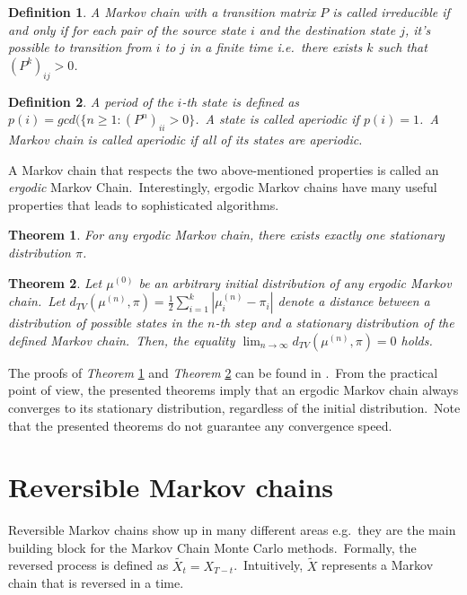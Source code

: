 \documentclass[a4paper, 11pt, onecolumn, openany, titlepage]{report}
\theoremstyle{default_theorem_style}\newtheorem{theorem}{Theorem}
\theoremstyle{default_theorem_style}\newtheorem{definition}{Definition}
\begin{document}
\begin{definition}
A Markov chain with a transition matrix $P$ is called \textit{irreducible} if and only if for each pair of the source
state $i$ and the destination state $j$, it's possible to transition from $i$ to $j$ in a finite time i.e.\ there
exists $k$ such that $(P^k)_{ij} > 0$.
\end{definition}

\begin{definition}
A period of the $i$-th state is defined as $p(i) = gcd(\{n \geq 1 : (P^n)_{ii} > 0\}$.\ A state is called
\textit{aperiodic} if $p(i) = 1$.\ A Markov chain is called aperiodic if all of its states are aperiodic.
\end{definition}

A Markov chain that respects the two above-mentioned properties is called an \textit{ergodic} Markov
Chain.\ Interestingly, ergodic Markov chains have many useful properties that leads to sophisticated algorithms.

\begin{theorem}\label{thm:one_stationary}
For any ergodic Markov chain, there exists exactly one stationary distribution $\pi$.
\end{theorem}

\begin{theorem}\label{thm:converges_to_stationary}
Let $\mu^{(0)}$ be an arbitrary initial distribution of any ergodic Markov chain.\ Let
$d_{TV}(\mu^{(n)}, \pi) = \frac{1}{2} \sum_{i = 1}^{k} |\mu_i^{(n)} - \pi_i|$ denote a distance between a
distribution of possible states in the $n$-th step and a stationary distribution of the defined Markov chain.\ Then,
the equality $\lim_{n \to \infty} d_{TV}(\mu^{(n)}, \pi) = 0$ holds.
\end{theorem}

The proofs of \textit{Theorem} \ref{thm:one_stationary} and \textit{Theorem} \ref{thm:converges_to_stationary} can
be found in \cite{markov_chains_book}.\ From the practical point of view, the presented theorems imply that an
ergodic Markov chain always converges to its stationary distribution, regardless of the initial
distribution.\ Note that the presented theorems do not guarantee any convergence speed.

\section{Reversible Markov chains}

Reversible Markov chains show up in many different areas e.g.\ they are the main building block for the Markov
Chain Monte Carlo methods.\ Formally, the reversed process is defined as $\tilde{X_t} = X_{T - t}$.\ Intuitively,
$\tilde{X}$ represents a Markov chain that is reversed in a time.
\end{document}
